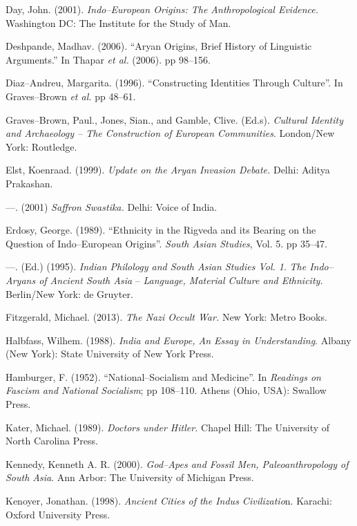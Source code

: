 \begin{thebibliography}{99}
  Day, John. (2001). \textit{Indo–European Origins: The Anthropological Evidence.} Washington DC: The Institute for the Study of Man.

  Deshpande, Madhav. (2006). “Aryan Origins, Brief History of Linguistic Arguments.” In Thapar \textit{et al.} (2006). pp 98–156.

  Diaz–Andreu, Margarita. (1996). “Constructing Identities Through Culture”. In Graves–Brown \textit{et al.} pp 48–61.

  Graves–Brown, Paul., Jones, Sian., and Gamble, Clive. (Ed.s). \textit{Cultural Identity and Archaeology – The Construction of European Communities}. London/New York: Routledge.

  Elst, Koenraad. (1999). \textit{Update on the Aryan Invasion Debate. }Delhi: Aditya Prakashan.

  —. (2001) \textit{Saffron Swastika. }Delhi: Voice of India.

  Erdosy, George. (1989). “Ethnicity in the Rigveda and its Bearing on the Question of Indo–European Origins”. \textit{South Asian Studies}, Vol. 5. pp 35–47.

  —. (Ed.) (1995). \textit{Indian Philology and South Asian Studies Vol. 1}. \textit{The Indo–Aryans of Ancient South Asia} – \textit{Language, Material Culture and Ethnicity. } Berlin/New York: de Gruyter.

  Fitzgerald, Michael. (2013). \textit{The Nazi Occult War. }New York: Metro Books.

  Halbfass, Wilhem. (1988). \textit{India and Europe, An Essay in Understanding}. Albany (New York): State University of New York Press.

  Hamburger, F. (1952). “National–Socialism and Medicine”. In \textit{Readings on Fascism and National Socialism}; pp 108–110. Athens (Ohio, USA): Swallow Press.

  Kater, Michael. (1989). \textit{Doctors under Hitler.} Chapel Hill: The University of North Carolina Press.

  Kennedy, Kenneth A. R. (2000). \textit{God–Apes and Fossil Men, Paleoanthropology of South Asia}. Ann Arbor: The University of Michigan Press.

  Kenoyer, Jonathan. (1998). \textit{Ancient Cities of the Indus Civilizatio}n. Karachi: Oxford University Press.


\end{thebibliography}

